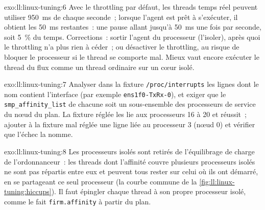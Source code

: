 \begin{solution}{exo:ll:linux-tuning:6}
Avec le throttling par défaut, les threads temps réel peuvent utiliser \qty{950}{\milli\second} de chaque seconde~; lorsque l'agent est prêt à s'exécuter, il obtient
les \qty{50}{\milli\second} restantes~: une pause allant jusqu'à \qty{50}{\milli\second} une fois par seconde, soit 5~\% du temps. Corrections~: sortir l'agent du processeur (l'isoler),
après quoi le throttling n'a plus rien à céder~; ou désactiver le throttling, au risque de bloquer le processeur
si le thread se comporte mal. Mieux vaut encore exécuter le thread du flux comme un thread ordinaire sur un cœur isolé.
\end{solution}

\begin{solution}{exo:ll:linux-tuning:7}
Analyser dans la fixture \texttt{/proc/interrupts} les lignes dont le nom contient l'interface (par exemple \texttt{ens1f0-TxRx-0}),
et exiger que le \texttt{smp\_affinity\_list} de chacune soit un sous-ensemble des processeurs de service du nœud du plan. La
fixture réglée les lie aux processeurs 16 à 20 et réussit~; ajouter à la fixture mal réglée une ligne liée au processeur 3 (nœud 0) et
vérifier que l'échec la nomme.
\end{solution}

\begin{solution}{exo:ll:linux-tuning:8}
Les processeurs isolés sont retirés de l'équilibrage de charge de l'ordonnanceur~: les threads dont l'affinité couvre plusieurs processeurs isolés ne sont pas
répartis entre eux et peuvent tous rester sur celui où ils ont démarré, en se partageant ce seul processeur (la courbe commune de la
\cref{fig:ll:linux-tuning:hiccups}). Il faut épingler chaque thread à son propre processeur isolé, comme le fait \texttt{firm.affinity} à partir du plan.
\end{solution}

